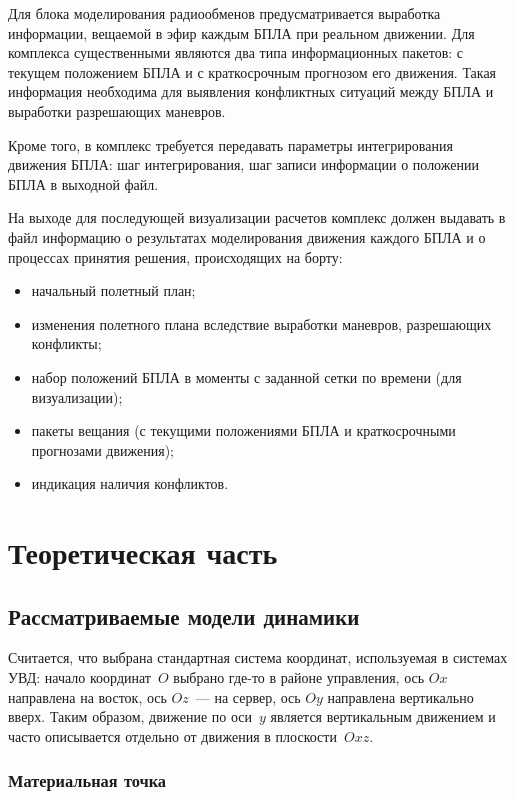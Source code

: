 \documentclass[a4paper,12pt]{article}
\begin{document}
Для блока моделирования радиообменов предусматривается выработка информации, вещаемой в эфир каждым БПЛА при реальном движении. Для комплекса существенными являются два типа информационных пакетов: с текущем положением БПЛА и с краткосрочным прогнозом его движения. Такая информация необходима для выявления конфликтных ситуаций между БПЛА и выработки разрешающих маневров.

Кроме того, в комплекс требуется передавать параметры интегрирования движения БПЛА: шаг интегрирования, шаг записи информации о положении БПЛА в выходной файл.

На выходе для последующей визуализации расчетов комплекс должен выдавать в файл информацию о результатах моделирования движения каждого БПЛА и о процессах принятия решения, происходящих на борту:
\begin{itemize}
  \item начальный полетный план;
  \item изменения полетного плана вследствие выработки маневров, разрешающих конфликты;
  \item набор положений БПЛА в моменты с заданной сетки по времени (для визуализации);
  \item пакеты вещания (с текущими положениями БПЛА и краткосрочными прогнозами движения);
  \item индикация наличия конфликтов.
\end{itemize}

\newpage



\section{Теоретическая часть}

\subsection{Рассматриваемые модели динамики}

Считается, что выбрана стандартная система координат, используемая в системах УВД: начало координат~$O$ выбрано где-то в районе управления, ось $Ox$ направлена на восток, ось $Oz$~--- на сервер, ось $Oy$ направлена вертикально вверх. Таким образом, движение по оси~$y$ является вертикальным движением и часто описывается отдельно от движения в плоскости~$Oxz$.


\subsubsection{Материальная точка}
\end{document}
